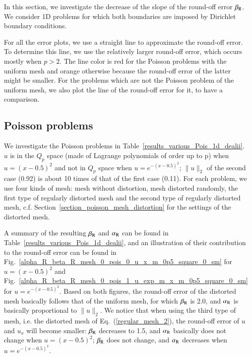 \documentclass[review,3p]{elsarticle}
\begin{document}
In this section, we investigate the decrease of the slope of the round-off error $\beta_{\rm R}$.
We consider 1D problems for which both boundaries are imposed by Dirichlet boundary conditions. 

For all the error plots, we use a straight line to approximate the round-off error.
To determine this line, we use the relatively larger round-off error, which occurs mostly when $p>2$.
The line color is red for the Poisson problems with the uniform mesh and orange otherwise because the round-off error of the latter might be smaller.
For the problems which are not the Poisson problem of the uniform mesh, we also plot the line of the round-off error for it, to have a comparison.

\subsection{Poisson problems}			\label{section_decrease_beta_r_1d_pois}

We investigate the Poisson problems in Table~\ref{results_various_Pois_1d_dealii}.
$u$ is in the $Q_p$ space (made of Lagrange polynomials of order up to p) when $u=(x-0.5)^2$ and not in $Q_p$ space when $u=e^{-(x-0.5)^2}$; $\|u\|_2$ of the second case (0.92) is about 10 times of that of the first case (0.11).
For each problem, we use four kinds of mesh: mesh without distortion, mesh distorted randomly, the first type of regularly distorted mesh and the second type of regularly distorted mesh, c.f. Section~\ref{section_poisson_mesh_distortion} for the settings of the distorted mesh.

A summary of the resulting $\beta_{\rm R}$ and $\alpha_{\rm R}$ can be found in Table~\ref{results_various_Pois_1d_dealii}, and an illustration of their contribution to the round-off error can be found in Fig.~\ref{alpha_R_beta_R_mesh_0_pois_0_u_x_m_0p5_square_0_sm} for $u=(x-0.5)^2$ and Fig.~\ref{alpha_R_beta_R_mesh_0_pois_1_u_exp_m_x_m_0p5_square_0_sm} for $u=e^{-(x-0.5)^2}$.
Based on both figures, the round-off error of the distorted mesh basically follows that of the uniform mesh, for which $\beta_{\rm R}$ is 2.0, and $\alpha_{\rm R}$ is basically proportional to $\|u\|_2$. 
We notice that when using the third type of mesh, i.e. the distorted mesh of Eq.~(\ref{regular_mesh_2}), the round-off error of $u$ and $u_x$ will become smaller: $\beta_{\rm R}$ decreases to 1.5, and $\alpha_{\rm R}$ basically does not change when $u=(x-0.5)^2$; $\beta_{\rm R}$ does not change, and $\alpha_{\rm R}$ decreases when $u=e^{-(x-0.5)^2}$.
\end{document}
